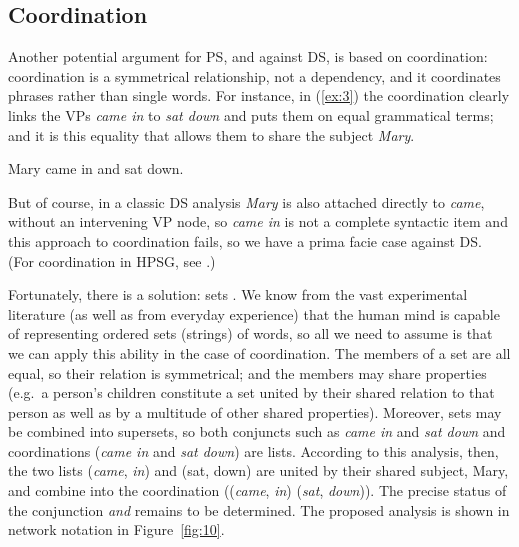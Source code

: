 \documentclass[output=paper
	        ,collection
	        ,collectionchapter
 	        ,biblatex
                ,babelshorthands
                ,newtxmath
                ,draftmode
                ,colorlinks, citecolor=brown
]{langscibook}
\begin{document}
\subsection{Coordination}
\label{sec:4.2}

Another potential argument for PS, and against DS, is based on coordination: coordination is a symmetrical relationship, not a dependency, and it coordinates phrases rather than single words. For instance, in (\ref{ex:3}) the coordination clearly links the VPs \emph{came in} to \emph{sat down} and puts them on equal grammatical terms; and it is this equality that allows them to share the subject \emph{Mary}.

\begin{exe}
	\ex \label{ex:3} Mary came in and sat down.
\end{exe}

But of course, in a classic DS analysis \emph{Mary} is also attached directly to \emph{came}, without an intervening VP node, so \emph{came in} is not a complete syntactic item and this approach to coordination fails, so we have a prima facie case against DS. (For coordination in HPSG, see .)

Fortunately, there is a solution: sets \citep[404--421]{Hudson90a-u}. We know from the vast experimental literature (as well as from everyday experience) that the human mind is capable of representing ordered sets (strings) of words, so all we need to assume is that we can apply this ability in the case of coordination. The members of a set are all equal, so their relation is symmetrical; and the members may share properties (e.g.\ a person’s children constitute a set united by their shared relation to that person as well as by a multitude of other shared properties). Moreover, sets may be combined into supersets, so both conjuncts such as \emph{came in} and \emph{sat down} and coordinations (\emph{came in} and \emph{sat down}) are lists. According to this analysis, then, the two lists (\emph{came}, \emph{in}) and (sat, down) are united by their shared subject, Mary, and combine into the coordination ((\emph{came}, \emph{in}) (\emph{sat}, \emph{down})). The precise status of the conjunction \emph{and} remains to be determined. The proposed analysis is shown in network notation in Figure~\ref{fig:10}.
\end{document}
